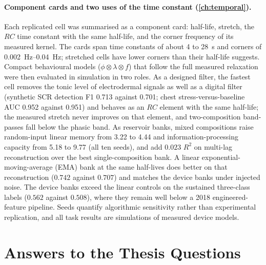\documentclass[12pt, twoside]{report}
\begin{document}
\paragraph{Component cards and two uses of the time constant (\cref{ch:temporal}).} Each replicated cell was summarised as a component card: half-life, stretch, the $RC$ time constant with the same half-life, and the corner frequency of its measured kernel. The cards span time constants of about 4 to \SI{28}{\second} and corners of \SIrange{0.002}{0.04}{\hertz}; stretched cells have lower corners than their half-life suggests. Compact behavioural models ($\phi \otimes \lambda \otimes f$) that follow the full measured relaxation were then evaluated in simulation in two roles. As a designed filter, the fastest cell removes the tonic level of electrodermal signals as well as a digital filter (synthetic SCR detection F1 \num{0.713} against \num{0.701}; \WESAD{} chest stress-versus-baseline AUC \num{0.952} against \num{0.951}) and behaves as an $RC$ element with the same half-life; the measured stretch never improves on that element, and two-composition band-passes fall below the phasic band. As reservoir banks, mixed compositions raise random-input linear memory from \num{3.22} to \num{4.44} and information-processing capacity from \num{5.18} to \num{9.77} (all ten seeds), and add $0.023$ $R^2$ on multi-lag \WESAD{} reconstruction over the best single-composition bank. A linear exponential-moving-average (EMA) bank at the same half-lives does better on that reconstruction ($0.742$ against $0.707$) and matches the device banks under injected noise. The device banks exceed the linear controls on the sustained three-class labels ($0.562$ against $0.508$), where they remain well below a 2018 engineered-feature pipeline. Seeds quantify algorithmic sensitivity rather than experimental replication, and all task results are simulations of measured device models.

\section{Answers to the Thesis Questions}\label{sec:concl_questions}
\end{document}
